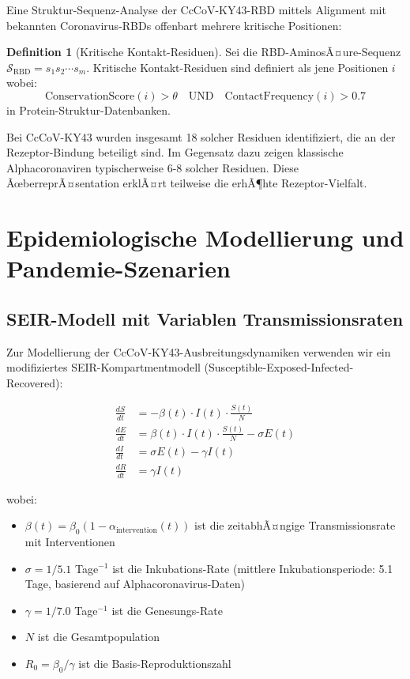 ﻿\documentclass[11pt,a4paper]{article}
\theoremstyle{definition}
\newtheorem{definition}[theorem]{Definition}
\begin{document}
Eine Struktur-Sequenz-Analyse der CcCoV-KY43-RBD mittels Alignment mit bekannten Coronavi\-rus-RBDs offenbart mehrere kritische Positionen:

\begin{definition}[Kritische Kontakt-Residuen]
Sei die RBD-AminosÃ¤ure-Sequenz $\mathcal{S}_{\text{RBD}} = s_1 s_2 \cdots s_m$. Kritische Kontakt-Residuen sind definiert als jene Positionen $i$ wobei:
\[
\text{ConservationScore}(i) > \theta \quad \text{UND} \quad \text{ContactFrequency}(i) > 0.7
\]
in Protein-Struktur-Datenbanken.
\end{definition}

Bei CcCoV-KY43 wurden insgesamt 18 solcher Residuen identifiziert, die an der Rezeptor-Bindung beteiligt sind. Im Gegensatz dazu zeigen klassische Alphacoronaviren typischerweise 6-8 solcher Residuen. Diese ÃœberreprÃ¤sentation erklÃ¤rt teilweise die erhÃ¶hte Rezeptor-Vielfalt.

\section{Epidemiologische Modellierung und Pandemie-Szenarien}

\subsection{SEIR-Modell mit Variablen Transmissionsraten}

Zur Modellierung der CcCoV-KY43-Ausbreitungsdynamiken verwenden wir ein modifiziertes SEIR-Kompartmentmodell (Susceptible-Exposed-Infected-Recovered):

\begin{align}
    \frac{dS}{dt} &= -\beta(t) \cdot I(t) \cdot \frac{S(t)}{N} \\
    \frac{dE}{dt} &= \beta(t) \cdot I(t) \cdot \frac{S(t)}{N} - \sigma E(t) \\
    \frac{dI}{dt} &= \sigma E(t) - \gamma I(t) \\
    \frac{dR}{dt} &= \gamma I(t)
\end{align}

wobei:
\begin{itemize}
\item $\beta(t) = \beta_0 (1 - \alpha_{\text{intervention}}(t))$ ist die zeitabhÃ¤ngige Transmissionsrate mit Interventionen
\item $\sigma = 1/5.1$ Tage$^{-1}$ ist die Inkubations-Rate (mittlere Inkubationsperiode: 5.1 Tage, basierend auf Alphacoronavirus-Daten)
\item $\gamma = 1/7.0$ Tage$^{-1}$ ist die Genesungs-Rate
\item $N$ ist die Gesamtpopulation
\item $R_0 = \beta_0 / \gamma$ ist die Basis-Reproduktionszahl
\end{itemize}
\end{document}

